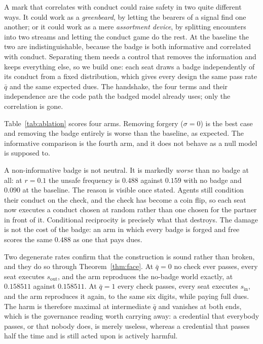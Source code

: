 \documentclass[11pt,a4paper]{article}
\begin{document}
A mark that correlates with conduct could raise safety in two quite different
ways. It could work as a \emph{greenbeard}, by letting the bearers of a signal
find one another; or it could work as a mere \emph{assortment device}, by
splitting encounters into two streams and letting the conduct game do the rest.
At the baseline the two are indistinguishable, because the badge is both
informative and correlated with conduct. Separating them needs a control that
removes the information and keeps everything else, so we build one: each seat
draws a badge independently of its conduct from a fixed distribution, which
gives every design the same pass rate $\bar{q}$ and the same expected dues. The
handshake, the four terms and their independence are the code path the badged
model already uses; only the correlation is gone.



Table~\ref{tab:ablation} scores four arms. Removing forgery ($\sigma = 0$) is
the best case and removing the badge entirely is worse than the baseline, as
expected. The informative comparison is the fourth arm, and it does not behave
as a null model is supposed to.

A non-informative badge is not neutral. It is markedly \emph{worse} than no
badge at all: at $r = 0.1$ the unsafe frequency is $0.488$ against $0.159$ with
no badge and $0.090$ at the baseline. The reason is visible once stated. Agents
still condition their conduct on the check, and the check has become a coin
flip, so each seat now executes a conduct chosen at random rather than one
chosen for the partner in front of it. Conditional reciprocity is precisely
what that destroys. The damage is not the cost of the badge: an arm in which
every badge is forged and free scores the same $0.488$ as one that pays dues.

Two degenerate rates confirm that the construction is sound rather than broken,
and they do so through Theorem~\ref{thm:face}. At $\bar{q} = 0$ no check ever
passes, every seat executes $s_{\mathrm{out}}$, and the arm reproduces the
no-badge world exactly, at $0.158511$ against $0.158511$. At $\bar{q} = 1$
every check passes, every seat executes $s_{\mathrm{in}}$, and the arm
reproduces it again, to the same six digits, while paying full dues. The harm
is therefore maximal at intermediate $\bar{q}$ and vanishes at both ends, which
is the governance reading worth carrying away: a credential that everybody
passes, or that nobody does, is merely useless, whereas a credential that
passes half the time and is still acted upon is actively harmful.
\end{document}

